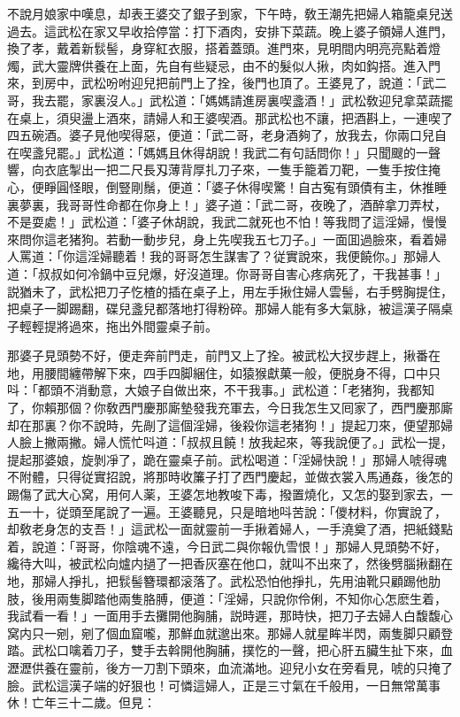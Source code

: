 不說月娘家中嘆息，却表王婆交了銀子到家，下午時，敎王潮先把婦人箱籠桌兒送過去。這武松在家又早收拾停當：打下酒肉，安排下菜蔬。晚上婆子領婦人進門，換了孝，戴着新䯼髻，身穿紅衣服，搭着蓋頭。進門來，見明間内明亮亮點着燈燭，武大靈牌供養在上面，先自有些疑忌，由不的髮似人揪，肉如鈎搭。進入門來，到房中，武松吩咐迎兒把前門上了拴，後門也頂了。王婆見了，說道：「武二哥，我去罷，家裏沒人。」武松道：「媽媽請進房裏喫盞酒！」武松敎迎兒拿菜蔬擺在桌上，須臾盪上酒來，請婦人和王婆喫酒。那武松也不讓，把酒斟上，一連喫了四五碗酒。婆子見他喫得惡，便道：「武二哥，老身酒夠了，放我去，你兩口兒自在喫盞兒罷。」武松道：「媽媽且休得胡說！我武二有句話問你！」只聞颼的一聲響，向衣底掣出一把二尺長刄薄背厚扎刀子來，一隻手籠着刀靶，一隻手按住掩心，便睜圓怪眼，倒豎剛鬚，便道：「婆子休得喫驚！自古寃有頭債有主，休推睡裏夢裏，我哥哥性命都在你身上！」婆子道：「武二哥，夜晚了，酒醉拿刀弄杖，不是耍處！」武松道：「婆子休胡說，我武二就死也不怕！等我問了這淫婦，慢慢來問你這老猪狗。若動一動步兒，身上先喫我五七刀子。」一面囬過臉來，看着婦人罵道：「你這淫婦聽着！我的哥哥怎生謀害了？従實說來，我便饒你。」那婦人道：「叔叔如何冷鍋中豆兒爆，好沒道理。你哥哥自害心疼病死了，干我甚事！」説猶未了，武松把刀子忔楂的插在桌子上，用左手揪住婦人雲髻，右手劈胸提住，把桌子一脚踢翻，碟兒盞兒都落地打得粉碎。那婦人能有多大氣脉，被這漢子隔桌子輕輕提將過來，拖出外間靈桌子前。

那婆子見頭勢不好，便走奔前門走，前門又上了拴。被武松大扠步趕上，揪番在地，用腰間纏帶解下來，四手四脚綑住，如猿猴獻菓一般，便脱身不得，口中只呌：「都頭不消動意，大娘子自做出來，不干我事。」武松道：「老猪狗，我都知了，你賴那個？你敎西門慶那廝墊發我充軍去，今日我怎生又囘家了，西門慶那廝却在那裏？你不說時，先剮了這個淫婦，後殺你這老猪狗！」提起刀來，便望那婦人臉上撇兩撇。婦人慌忙呌道：「叔叔且饒！放我起來，等我說便了。」武松一提，提起那婆娘，旋剝凈了，跪在靈桌子前。武松喝道：「淫婦快說！」那婦人唬得魂不附體，只得従實招說，將那時收簾子打了西門慶起，並做衣裳入馬通姦，後怎的踢傷了武大心窝，用何人薬，王婆怎地教唆下毒，撥置燒化，又怎的娶到家去，一五一十，従頭至尾說了一遍。王婆聽見，只是暗地呌苦說：「儍材料，你實說了，却敎老身怎的支吾！」這武松一面就靈前一手揪着婦人，一手澆奠了酒，把紙錢點着，說道：「哥哥，你陰魂不遠，今日武二與你報仇雪恨！」那婦人見頭勢不好，纔待大叫，被武松向爐内撾了一把香灰塞在他口，就叫不出來了，然後劈腦揪翻在地，那婦人掙扎，把䯼髻簪環都滚落了。武松恐怕他掙扎，先用油靴只顧踢他肋肢，後用兩隻脚踏他兩隻胳膊，便道：「淫婦，只說你伶俐，不知你心怎麽生着，我試看一看！」一面用手去攤開他胸脯，説時遲，那時快，把刀子去婦人白馥馥心窝内只一剜，剜了個血窟嚨，那鮮血就邈出來。那婦人就星眸半閃，兩隻脚只顧登踏。武松口噙着刀子，雙手去斡開他胸脯，撲忔的一聲，把心肝五臟生扯下來，血瀝瀝供養在靈前，後方一刀割下頭來，血流滿地。迎兒小女在旁看見，唬的只掩了臉。武松這漢子端的好狠也！可憐這婦人，正是三寸氣在千般用，一日無常萬事休！亡年三十二歲。但見：


